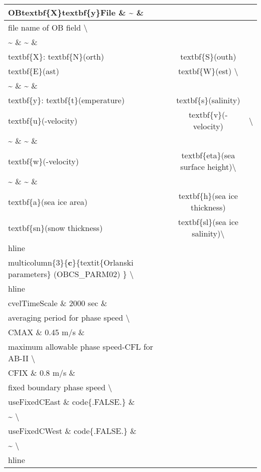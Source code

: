 \documentclass[letterpaper,10pt,english]{sphinxmanual}
\begin{document}
\begin{longtable}{|l|c|l|}
\hline
OBtextbf\{X\}textbf\{y\}File \& \textasciitilde{} \&
&&\\
\hline
file name of OB field \textbackslash{}
&&\\
\hline
\textasciitilde{} \& \textasciitilde{} \&
&&\\
\hline
textbf\{X\}: textbf\{N\}(orth)
&
textbf\{S\}(outh)
&\\
\hline
textbf\{E\}(ast)
&
textbf\{W\}(est) \textbackslash{}
&\\
\hline
\textasciitilde{} \& \textasciitilde{} \&
&&\\
\hline
textbf\{y\}: textbf\{t\}(emperature)
&
textbf\{s\}(salinity)
&\\
\hline
textbf\{u\}(-velocity)
&
textbf\{v\}(-velocity)
&
\textbackslash{}
\\
\hline
\textasciitilde{} \& \textasciitilde{} \&
&&\\
\hline
textbf\{w\}(-velocity)
&
textbf\{eta\}(sea surface height)\textbackslash{}
&\\
\hline
\textasciitilde{} \& \textasciitilde{} \&
&&\\
\hline
textbf\{a\}(sea ice area)
&
textbf\{h\}(sea ice thickness)
&\\
\hline
textbf\{sn\}(snow thickness)
&
textbf\{sl\}(sea ice salinity)\textbackslash{}
&\\
\hline
hline
&&\\
\hline
multicolumn\{3\}\{{\color{red}\bfseries{}\textbar{}c\textbar{}}\}\{textit\{Orlanski parameters\} (OBCS\_PARM02) \} \textbackslash{}
&&\\
\hline
hline
&&\\
\hline
cvelTimeScale \& 2000 sec \&
&&\\
\hline
averaging period for phase speed \textbackslash{}
&&\\
\hline
CMAX \& 0.45 m/s \&
&&\\
\hline
maximum allowable phase speed-CFL for AB-II \textbackslash{}
&&\\
\hline
CFIX \& 0.8 m/s \&
&&\\
\hline
fixed boundary phase speed \textbackslash{}
&&\\
\hline
useFixedCEast \& code\{.FALSE.\} \&
&&\\
\hline
\textasciitilde{} \textbackslash{}
&&\\
\hline
useFixedCWest \& code\{.FALSE.\} \&
&&\\
\hline
\textasciitilde{} \textbackslash{}
&&\\
\hline
hline
&&\\

\end{longtable}
\end{document}
